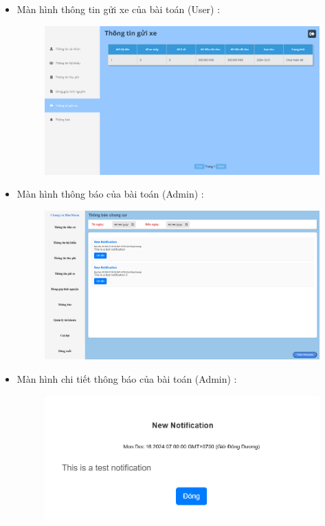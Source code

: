 \documentclass{article}
\begin{document}
\begin{itemize}
\begin{figure}[H]
    \end{figure}
    \vspace{1cm}
    \item Màn hình thông tin gửi xe của bài toán (User) :
    \begin{figure}[H]
        \centering
        \includegraphics[width=1\textwidth]{Ảnh chương 4/Gửi xe 2.png}
    \end{figure}
    \newpage
    \item Màn hình thông báo của bài toán (Admin) :
    \begin{figure}[H]
        \centering
        \includegraphics[width=1\textwidth]{Ảnh chương 4/Thông báo 1.png}
    \end{figure}
    \item Màn hình chi tiết thông báo của bài toán (Admin) :
    \begin{figure}[H]
        \centering
        \includegraphics[width=1\textwidth]{Ảnh chương 4/Chi tiết thông báo 1.png}

\end{figure}
\end{itemize}
\end{document}
